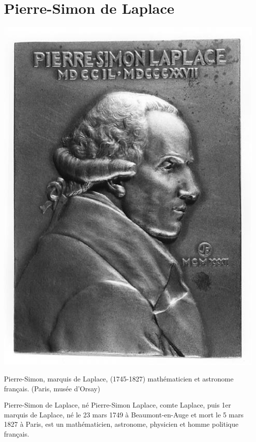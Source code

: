 \chapter{Pierre-Simon de Laplace\label{annexe-lap_irl}}
\begin{marginfigure}
    \centering
    \includegraphics[width=0.9\linewidth]{fig/Pierre-Simon-Laplace_2}
    \captionsetup{width=0.8\linewidth}
    \caption*{Pierre-Simon, marquis de Laplace,  (1745-1827) mathématicien 
             et astronome français. (Paris, musée d'Orsay)}
\end{marginfigure}
\indent Pierre-Simon de Laplace, né Pierre-Simon Laplace, comte Laplace, puis 
1er marquis de Laplace, né le 23 mars 1749 à Beaumont-en-Auge et mort le 5 
mars 1827 à Paris, est un mathématicien, astronome, physicien et homme 
politique français.

